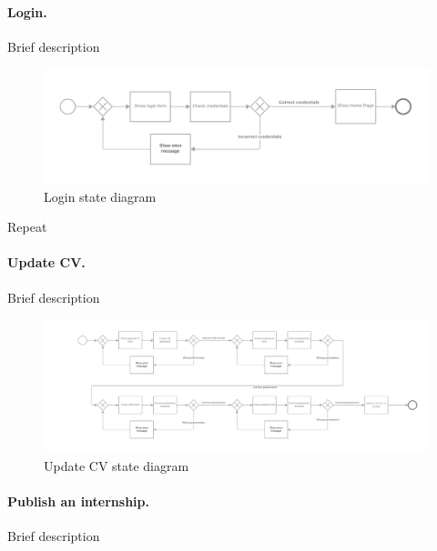 \paragraph{Login.}
Brief description

\begin{figure}[H]
    \begin{center}
        \includegraphics[width=1\linewidth]{RASD/LaTeX/Images/StateDiagrams/login.png}
        \caption{Login state diagram}
        \label{fig:login_sd}%
    \end{center}
\end{figure}

Repeat

\paragraph{Update CV.}
Brief description

\begin{figure}[H]
    \begin{center}
        \includegraphics[width=1\linewidth]{RASD/LaTeX/Images/StateDiagrams/update_cv.png}
        \caption{Update CV state diagram}
        \label{fig:update_cv_sd}%
    \end{center}
\end{figure}

\paragraph{Publish an internship.}
Brief description

